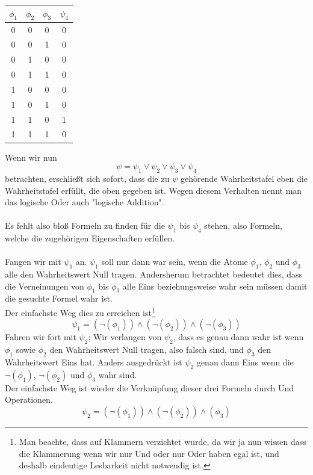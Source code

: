 \documentclass[11pt,a4paper,leqno]{report}
\numberwithin{equation}{chapter}
\begin{document}
\begin{center}
	\begin{minipage}{1.2in}
		\begin{tabular}{|c c c|c|}
			$\phi_1$ & $\phi_2$ & $\phi_3$ &$\psi_4$\\
			\hline
			0 & 0 & 0 & 0\\
			0 & 0 & 1 & 0\\
			0 & 1 & 0 & 0\\
			0 & 1 & 1 & 0\\
			1 & 0 & 0 & 0\\
			1 & 0 & 1 & 0\\
			1 & 1 & 0 & 1\\
			1 & 1 & 1 & 0\\
			\hline
		\end{tabular}  
	\end{minipage}
\end{center}
Wenn wir nun
\begin{equation}
	\psi = \psi_1\vee\psi_2\vee\psi_3\vee\psi_4
\end{equation}
betrachten, erschlie\ss{}t sich sofort, dass die zu $\psi$ geh\"orende Wahrheitstafel eben die Wahrheitstafel erf\"ullt, die oben gegeben ist. Wegen diesem Verhalten nennt man das logische Oder auch "logische Addition".\\
\\
Es fehlt also blo\ss{} Formeln zu finden f\"ur die $\psi_1$ bis $\psi_4$ stehen, also Formeln, welche die zugeh\"origen Eigenschaften erf\"ullen.\\
\\
Fangen wir mit $\psi_1$ an. $\psi_1$ soll nur dann war sein, wenn die Atome $\phi_1$, $\phi_2$ und $\phi_3$ alle den Wahrheitswert Null tragen. Andersherum betrachtet bedeutet dies, dass die Verneinungen von $\phi_1$ bis $\phi_3$ alle Eins beziehungsweise wahr sein m\"ussen damit die gesuchte Formel wahr ist.\\
Der einfachste Weg dies zu erreichen ist\footnote{Man beachte, dass auf Klammern verzichtet wurde, da wir ja nun wissen dass die Klammerung wenn wir nur Und oder nur Oder haben egal ist, und deshalb eindeutige Lesbarkeit nicht notwendig ist.}
\begin{equation}
	\psi_1 = (\neg(\phi_1))\wedge(\neg(\phi_2))\wedge(\neg(\phi_3))
\end{equation}
Fahren wir fort mit $\psi_2$; Wir verlangen von $\psi_2$, dass es genau dann wahr ist wenn $\phi_1$ sowie $\phi_2$ den Wahrheitswert Null tragen, also falsch sind, und $\phi_3$ den Wahrheitswert Eins hat. Anders ausgedr\"uckt ist $\psi_2$ genau dann Eins wenn die $\neg(\phi_1)$, $\neg(\phi_2)$ und $\phi_3$ wahr sind.\\
Der einfachste Weg ist wieder die Verkn\"upfung dieser drei Formeln durch Und Operationen.  
\begin{equation}
	\psi_2 = (\neg(\phi_1))\wedge(\neg(\phi_2))\wedge(\phi_3)
\end{equation}
\end{document}
